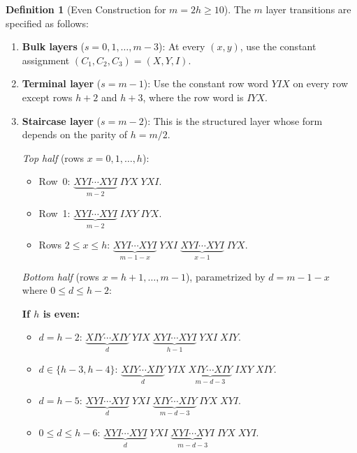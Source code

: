\documentclass[11pt]{article}
\theoremstyle{definition}
\newtheorem{definition}[theorem]{Definition}
\theoremstyle{remark}
\begin{document}
\begin{definition}[Even Construction for $m = 2h \geq 10$]
\label{def:even}
The $m$ layer transitions are specified as follows:
\begin{enumerate}[label=(\alph*)]
    \item \textbf{Bulk layers} ($s = 0, 1, \ldots, m-3$): At every $(x,y)$, use the constant assignment $(C_1, C_2, C_3) = (X, Y, I)$.

    \item \textbf{Terminal layer} ($s = m-1$): Use the constant row word $YIX$ on every row except rows $h+2$ and $h+3$, where the row word is $IYX$.

    \item \textbf{Staircase layer} ($s = m-2$): This is the structured layer whose form depends on the parity of $h = m/2$.

    \emph{Top half} (rows $x = 0, 1, \ldots, h$):
    \begin{itemize}
        \item Row~0: $\underbrace{XYI \cdots XYI}_{m-2} \; IYX \; YXI$.
        \item Row~1: $\underbrace{XYI \cdots XYI}_{m-2} \; IXY \; IYX$.
        \item Rows $2 \leq x \leq h$: $\underbrace{XYI \cdots XYI}_{m-1-x} \; YXI \; \underbrace{XYI \cdots XYI}_{x-1} \; IYX$.
    \end{itemize}

    \emph{Bottom half} (rows $x = h+1, \ldots, m-1$), parametrized by $d = m - 1 - x$ where $0 \leq d \leq h - 2$:

    \textbf{If $h$ is even:}
    \begin{itemize}
        \item $d = h-2$: $\underbrace{XIY \cdots XIY}_{d} \; YIX \; \underbrace{XYI \cdots XYI}_{h-1} \; YXI \; XIY$.
        \item $d \in \{h-3, h-4\}$: $\underbrace{XIY \cdots XIY}_{d} \; YIX \; \underbrace{XIY \cdots XIY}_{m-d-3} \; IXY \; XIY$.
        \item $d = h-5$: $\underbrace{XYI \cdots XYI}_{d} \; YXI \; \underbrace{XIY \cdots XIY}_{m-d-3} \; IYX \; XYI$.
        \item $0 \leq d \leq h-6$: $\underbrace{XYI \cdots XYI}_{d} \; YXI \; \underbrace{XYI \cdots XYI}_{m-d-3} \; IYX \; XYI$.
    \end{itemize}


\end{enumerate}
\end{definition}
\end{document}
